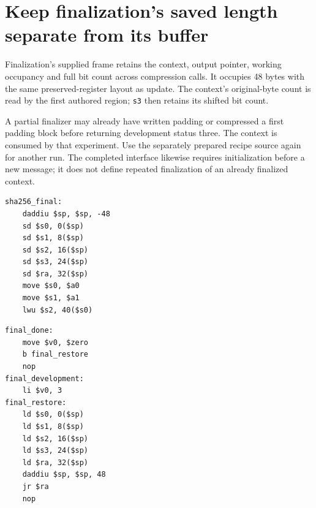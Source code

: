 \section{Keep finalization's saved length separate from its buffer}
Finalization's supplied frame retains the context, output pointer, working occupancy
and full bit count across compression calls. It occupies 48 bytes with the same
preserved-register layout as update. The context's original-byte count is read by the
first authored region; \texttt{s3} then retains its shifted bit count.

A partial finalizer may already have written padding or compressed a first padding
block before returning development status three. The context is consumed by that
experiment. Use the separately prepared recipe source again for another run. The
completed interface likewise requires initialization before a new message; it does
not define repeated finalization of an already finalized context.

\begin{verbatim}
sha256_final:
    daddiu $sp, $sp, -48
    sd $s0, 0($sp)
    sd $s1, 8($sp)
    sd $s2, 16($sp)
    sd $s3, 24($sp)
    sd $ra, 32($sp)
    move $s0, $a0
    move $s1, $a1
    lwu $s2, 40($s0)
\end{verbatim}

\begin{verbatim}
final_done:
    move $v0, $zero
    b final_restore
    nop
final_development:
    li $v0, 3
final_restore:
    ld $s0, 0($sp)
    ld $s1, 8($sp)
    ld $s2, 16($sp)
    ld $s3, 24($sp)
    ld $ra, 32($sp)
    daddiu $sp, $sp, 48
    jr $ra
    nop

\end{verbatim}
